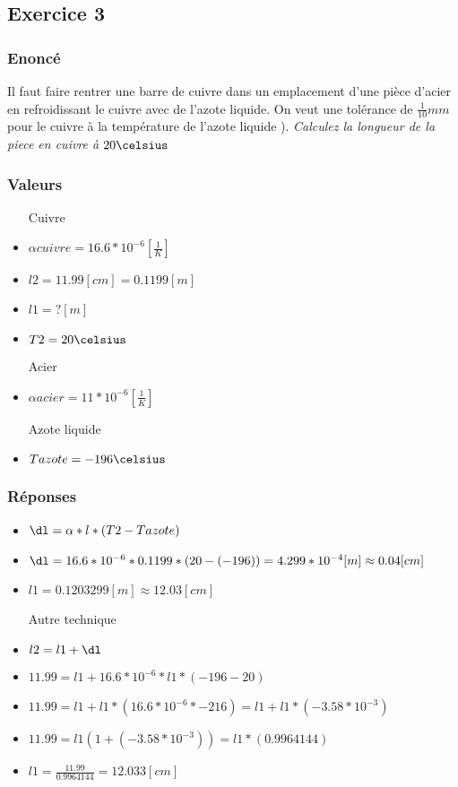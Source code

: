 
\subsection{Exercice 3}
\subsubsection{Enoncé}
Il faut faire rentrer une barre de cuivre dans un emplacement d'une pièce d'acier en refroidissant le cuivre avec de l'azote liquide. On veut une tolérance de $\frac{1}{10}mm$ pour le cuivre à la température de l'azote liquide ).
\textit{Calculez la longueur de la piece en cuivre à $20\celsius$}

\subsubsection{Valeurs}
\begin{itemize}
    \item[Cuivre]
    \item ${\alpha}cuivre = 16.6 * 10^{-6}[\frac{1}{K}]$
    \item $l2 = 11.99[cm] = 0.1199 [m]$
    \item $l1 = ? [m]$
    \item $T2 = 20\celsius$
    \item[Acier]
    \item ${\alpha}acier = 11 * 10^{-6}[\frac{1}{K}]$
    \item[Azote liquide]
    \item  $Tazote = -196\celsius$
\end{itemize}

\subsubsection{Réponses}
\begin{itemize} 
    \item $\dl = \alpha * l * (T2 - Tazote)$
    \item $\dl = 16.6 * 10^{-6} * 0.1199 * (20 - (-196)) = 4.299 * 10^{-4} [m] \approx 0.04[cm]$
    \item $l1 = 0.1203299[m] \approx 12.03 [cm]$
    \item[Autre technique]
    \item $l2 = l1 + \dl$
    \item $11.99 = l1 + 16.6*10^{-6}*l1*(-196-20)$
    \item $11.99 = l1 + l1 * (16.6*10^{-6}*-216) = l1+l1 * (-3.58*10^{-3})$
    \item $11.99 = l1(1 + (-3.58*10^{-3})) = l1 * (0.9964144)$
    \item $l1 = \frac{11.99}{0.9964144} = 12.033[cm]$ 
\end{itemize}
